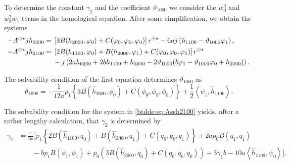 To determine the constant $\gamma_2$ and the coefficient $\vartheta_{1000}$ we
consider the $w_0^3$ and $w_0^2w_1$ terms in the homological equation. After
some simplification, we obtain the systems
\begin{align}
\label{btdde:eq:Assh3000}
-A^{\odot\star} jh_{3000} ={}& \left[3 B(h_{2000},\varphi_0) + C(\varphi_0,\varphi_0,\varphi_0)\right]r^{\odot\star} 
                            - 6a j\left( h_{1100} - \vartheta_{1000} \varphi_1 \right), \\
\label{btdde:eq:Assh2100}
-A^{\odot\star} jh_{2100} ={}& \left[2 B(h_{1100},\varphi_0) + B(h_{2000},\varphi_1) + C(\varphi_0,\varphi_0,\varphi_1)\right]r^{\odot\star} \\
                         & - j \left( 2 a h_{0200} + 2 b h_{1100} + h_{3000} 
                            - 2 \vartheta_{1000} (b\varphi_1 - \vartheta_{1000}\varphi_0 +h_{2000})\right).
\end{align}

The solvability condition of the first equation determines $\vartheta_{1000}$ as
\begin{equation}
\label{btdde:eq:theta1000}
\vartheta_{1000} = -\frac1{12a} p_1 \left\{ 
			3B(\hat h_{2000},\phi_0) + C(\phi_0,\phi_0,\phi_0)
            \right\} + \frac12 \left< \psi_1, \hat h_{1100} \right>.
\end{equation}

The solvability condition for the system in \cref{btdde:eq:Assh2100} yields, after a
rather lengthy calculation, that $\gamma_2$ is determined by 
\begin{align}
\label{btdde:eq:gamma_2}
\gamma_2 &= \frac1{6a} 
\bigg[ p_1\left\{ 2 B(\hat h_{1100},q_0) + B(\hat h_{2000},q_1) + C(q_0,q_0,q_1) \right\} 
        +2a p_0 B(q_1,q_1)  \nonumber \\
	& \qquad - b p_1 B(\phi_1,\phi_1) + p_0 \left( 3B(\hat h_{2000},q_0) + C(q_0,q_0,q_0) \right) 
    + 3 \gamma_1 b - 10 a \left< \hat h_{1100}, \psi_0 \right> \bigg]. \nonumber 
\end{align}

